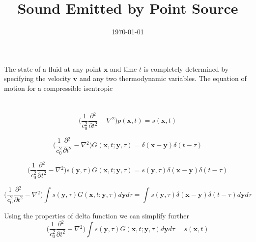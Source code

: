 \documentclass{article}
\title{Sound Emitted by Point Source}
\date{\today}
\author{}
\begin{document}
\maketitle
\section*{}
The state of a fluid at any point $\mathbf{x}$ and time $t$ is completely determined by specifying the velocity $\mathbf{v}$ and any two thermodynamic variables. The equation of motion for a compressible isentropic  

\section*{}
\begin{equation}\label{acoustic wave}
	\Bigg( \frac{1}{c_{0}^2}\frac{\partial{}^{2}}{\partial{t}^{2}}- \nabla{}^{2} \Bigg) p(\mathbf{x}, t) = s(\mathbf{x}, t)
\end{equation}  

\begin{equation}\label{green}
    \Bigg( \frac{1}{c_{0}^2}\frac{\partial{}^{2}}{\partial{t}^{2}}- \nabla{}^{2} \Bigg){G(\mathbf{x}, t; \mathbf{y}, \tau )} = \delta{(\mathbf{x} - \mathbf{y})}\delta{(t - \tau)} 
\end{equation}

\begin{equation}
    \Bigg( \frac{1}{c_{0}^2}\frac{\partial{}^{2}}{\partial{t}^{2}}- \nabla{}^{2} \Bigg)s(\mathbf{y}, \tau){G(\mathbf{x}, t; \mathbf{y}, \tau )} = s(\mathbf{y}, \tau)\delta{(\mathbf{x} - \mathbf{y})}\delta{(t - \tau)} 
\end{equation}

\begin{equation}
    \Bigg( \frac{1}{c_{0}^2}\frac{\partial{}^{2}}{\partial{t}^{2}}- \nabla{}^{2} \Bigg) \int s(\mathbf{y}, \tau){G(\mathbf{x}, t; \mathbf{y}, \tau )} d\mathbf{y}d\tau  = \int s(\mathbf{y}, \tau)\delta{(\mathbf{x} - \mathbf{y})}\delta{(t - \tau)} d\mathbf{y}d\tau  
\end{equation}

Using the properties of delta function we can simplify further
\begin{equation}
    \Bigg( \frac{1}{c_{0}^2}\frac{\partial{}^{2}}{\partial{t}^{2}}- \nabla{}^{2} \Bigg) \int s(\mathbf{y}, \tau){G(\mathbf{x}, t; \mathbf{y}, \tau )} d\mathbf{y}d\tau  = s(\mathbf{x}, t) 
\end{equation}
\end{document}
